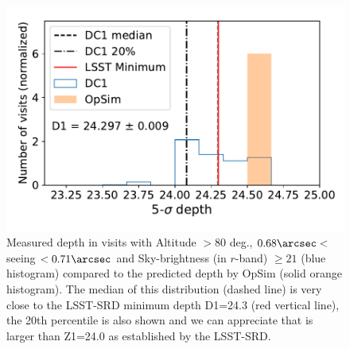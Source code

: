 \documentclass[\docopts]{\docclass}
\begin{document}
\begin{figure}
\centering
\includegraphics[width=0.85\columnwidth]{m5_goals}
\caption{Measured depth in visits with Altitude $>80$ deg., $0.68 \arcsec <$ seeing $ < 0.71 \arcsec$ and Sky-brightness (in $r$-band) $\geq 21$ (blue histogram) compared to the predicted depth by OpSim (solid orange histogram). The median of this distribution (dashed line) is very close to the LSST-SRD minimum depth D1=24.3 (red vertical line), the 20th percentile is also shown and we can appreciate that is larger than Z1=24.0 as established by the LSST-SRD.}
\label{fig:DF1_checks}
\end{figure}
\end{document}
